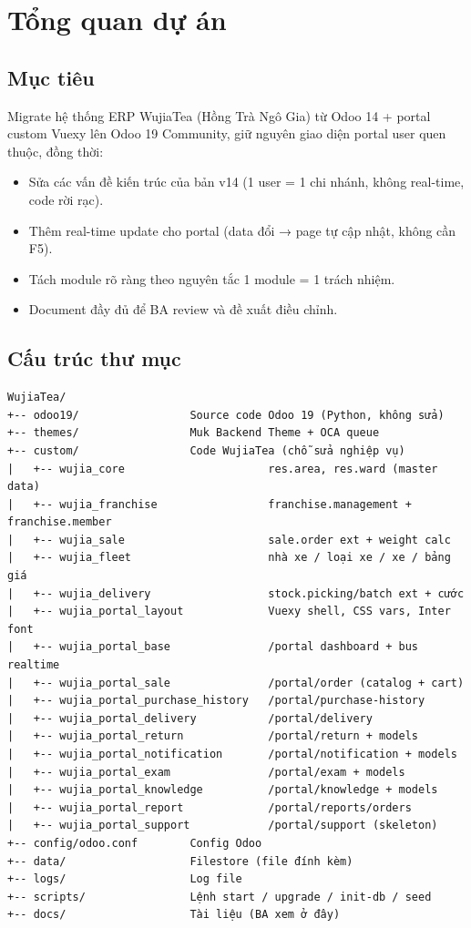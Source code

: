 \chapter{Tổng quan dự án}

\section{Mục tiêu}

Migrate hệ thống ERP WujiaTea (Hồng Trà Ngô Gia) từ Odoo 14 + portal custom Vuexy lên Odoo 19 Community, giữ nguyên giao diện portal user quen thuộc, đồng thời:

\begin{itemize}
    \item Sửa các vấn đề kiến trúc của bản v14 (1 user = 1 chi nhánh, không real-time, code rời rạc).
    \item Thêm real-time update cho portal (data đổi → page tự cập nhật, không cần F5).
    \item Tách module rõ ràng theo nguyên tắc 1 module = 1 trách nhiệm.
    \item Document đầy đủ để BA review và đề xuất điều chỉnh.
\end{itemize}

\section{Cấu trúc thư mục}

\begin{lstlisting}[style=shell]
WujiaTea/
+-- odoo19/                 Source code Odoo 19 (Python, không sửa)
+-- themes/                 Muk Backend Theme + OCA queue
+-- custom/                 Code WujiaTea (chỗ sửa nghiệp vụ)
|   +-- wujia_core                      res.area, res.ward (master data)
|   +-- wujia_franchise                 franchise.management + franchise.member
|   +-- wujia_sale                      sale.order ext + weight calc
|   +-- wujia_fleet                     nhà xe / loại xe / xe / bảng giá
|   +-- wujia_delivery                  stock.picking/batch ext + cước
|   +-- wujia_portal_layout             Vuexy shell, CSS vars, Inter font
|   +-- wujia_portal_base               /portal dashboard + bus realtime
|   +-- wujia_portal_sale               /portal/order (catalog + cart)
|   +-- wujia_portal_purchase_history   /portal/purchase-history
|   +-- wujia_portal_delivery           /portal/delivery
|   +-- wujia_portal_return             /portal/return + models
|   +-- wujia_portal_notification       /portal/notification + models
|   +-- wujia_portal_exam               /portal/exam + models
|   +-- wujia_portal_knowledge          /portal/knowledge + models
|   +-- wujia_portal_report             /portal/reports/orders
|   +-- wujia_portal_support            /portal/support (skeleton)
+-- config/odoo.conf        Config Odoo
+-- data/                   Filestore (file đính kèm)
+-- logs/                   Log file
+-- scripts/                Lệnh start / upgrade / init-db / seed
+-- docs/                   Tài liệu (BA xem ở đây)
\end{lstlisting}

